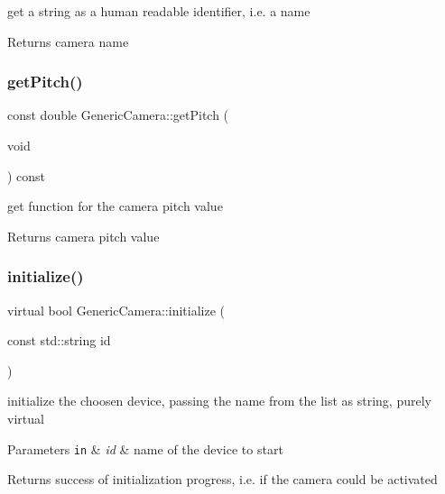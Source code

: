 get a string as a human readable identifier, i.\+e. a name \begin{DoxyReturn}{Returns}
camera name 
\end{DoxyReturn}
\mbox{\label{class_generic_camera_a429fbb0069ed11630ba5284235563f87}} 
\subsubsection{\texorpdfstring{get\+Pitch()}{getPitch()}}
{\footnotesize\ttfamily const double Generic\+Camera\+::get\+Pitch (\begin{DoxyParamCaption}\item[{void}]{ }\end{DoxyParamCaption}) const\hspace{0.3cm}{\ttfamily [inline]}}

get function for the camera pitch value \begin{DoxyReturn}{Returns}
camera pitch value 
\end{DoxyReturn}
\mbox{\label{class_generic_camera_ad050957bbb8003fc55f4656d43347f1e}} 
\subsubsection{\texorpdfstring{initialize()}{initialize()}}
{\footnotesize\ttfamily virtual bool Generic\+Camera\+::initialize (\begin{DoxyParamCaption}\item[{const std\+::string}]{id }\end{DoxyParamCaption})\hspace{0.3cm}{\ttfamily [pure virtual]}}

initialize the choosen device, passing the name from the list as string, purely virtual 
\begin{DoxyParams}[1]{Parameters}
\mbox{\tt in}  & {\em id} & name of the device to start \\
\hline
\end{DoxyParams}
\begin{DoxyReturn}{Returns}
success of initialization progress, i.\+e. if the camera could be activated 
\end{DoxyReturn}


